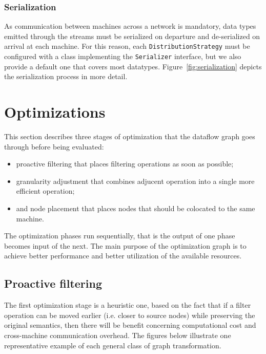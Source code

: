 \documentclass[sigplan,screen]{acmart}
\begin{document}
\subsubsection{Serialization}
As communication between machines across a network is mandatory, data types
emitted through the streams must be serialized on departure and de-serialized on
arrival at each machine. For this reason, each \texttt{DistributionStrategy}
must be configured with a class implementing the \texttt{Serializer} interface,
but we also provide a default one that covers most datatypes.
Figure~\ref{fig:serialization} depicts the serialization process in more detail.


\section{Optimizations} \label{sec:optimization}

This section describes three stages of optimization that the dataflow graph goes
through before being evaluated:
\begin{itemize}
  \item proactive filtering that places filtering operations as soon as possible;
  \item granularity adjustment that combines adjucent operation into a single more efficient operation;
  \item and node placement that places nodes that should be colocated to the same machine.
\end{itemize}
The optimization phases run sequentially, that is the output of one phase becomes
input of the next. The main purpose of the optimization graph is to achieve better
performance and better utilization of the available resources.

\subsection{Proactive filtering}
The first optimization stage is a heuristic one, based on the fact that if a
filter operation can be moved earlier (i.e. closer to source nodes) while
preserving the original semantics, then there will be benefit concerning
computational cost and cross-machine communication overhead. The figures below
illustrate one representative example of each general class of
graph transformation.

\end{document}
